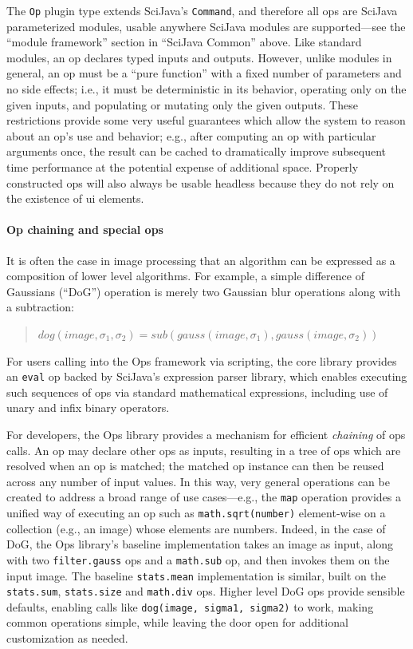 \documentclass{bmcart}
\begin{document}
The \texttt{Op} plugin type extends SciJava's \texttt{Command}, and therefore
all ops are SciJava parameterized modules, usable anywhere SciJava modules are
supported---see the ``module framework'' section in ``SciJava Common'' above.
Like standard modules, an op declares typed inputs and outputs. However, unlike
modules in general, an op must be a ``pure function'' with a fixed number of
parameters and no side effects; i.e., it must be deterministic in its behavior,
operating only on the given inputs, and populating or mutating only the given
outputs. These restrictions provide some very useful guarantees which allow the
system to reason about an op's use and behavior; e.g., after computing an op
with particular arguments once, the result can be cached to dramatically
improve subsequent time performance at the potential expense of additional
space. Properly constructed ops will also always be usable headless because
they do not rely on the existence of \acrshort{ui} elements.

\paragraph*{Op chaining and special ops}
It is often the case in image processing that an algorithm can be expressed as
a composition of lower level algorithms. For example, a simple difference of
Gaussians (``DoG'') operation is merely two Gaussian blur operations along with
a subtraction:

\begin{quote}
  $dog(image, \sigma_1, \sigma_2) =
  sub(gauss(image, \sigma_1), gauss(image, \sigma_2))$
\end{quote}

For users calling into the Ops framework via scripting, the core library
provides an \texttt{eval} op backed by SciJava's expression parser library,
which enables executing such sequences of ops via standard mathematical
expressions, including use of unary and infix binary operators.

For developers, the Ops library provides a mechanism for efficient
\textit{chaining} of ops calls. An op may declare other ops as inputs,
resulting in a tree of ops which are resolved when an op is matched; the
matched op instance can then be reused across any number of input values. In
this way, very general operations can be created to address a broad range of
use cases---e.g., the \texttt{map} operation provides a unified way of
executing an op such as \texttt{math.sqrt(number)} element-wise on a collection
(e.g., an image) whose elements are numbers. Indeed, in the case of DoG, the
Ops library's baseline implementation takes an image as input, along with two
\texttt{filter.gauss} ops and a \texttt{math.sub} op, and then invokes them on
the input image. The baseline \texttt{stats.mean} implementation is similar,
built on the \texttt{stats.sum}, \texttt{stats.size} and \texttt{math.div} ops.
Higher level DoG ops provide sensible defaults, enabling calls like
\texttt{dog(image, sigma1, sigma2)} to work, making common operations simple,
while leaving the door open for additional customization as needed.
\end{document}
